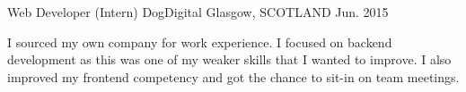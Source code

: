\begin{cventries}
  \cventry
    {Web Developer (Intern)} %
    {DogDigital} %
    {Glasgow, SCOTLAND} %
    {Jun. 2015} %
    {
      \begin{cvitems} %
        \item I sourced my own company for work experience. I focused on backend development as this was one of my weaker skills that I wanted to improve. I also improved my frontend competency and got the chance to sit-in on team meetings.
      \end{cvitems}
    }
\end{cventries}
\vspace{-0.3cm}
